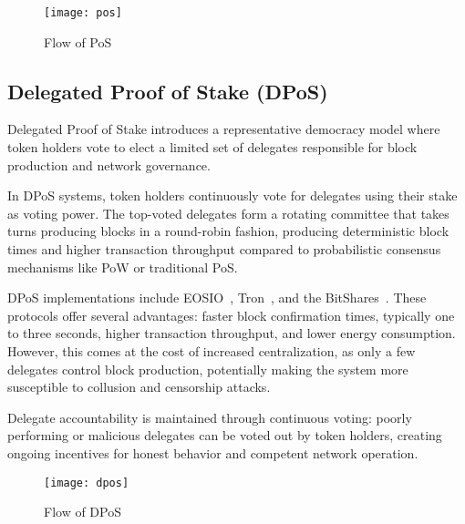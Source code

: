 \begin{figure}[h]
	\centering
	\texttt{[image: pos]}
	\caption{Flow of PoS}
	\label{fig:pos}
\end{figure}


\subsection{Delegated Proof of Stake (DPoS)}\label{sub:dpos}

Delegated Proof of Stake introduces a representative democracy model where token
holders vote to elect a limited set of delegates responsible for block production and network governance.

In DPoS systems, token holders continuously vote for delegates using their stake
as voting power. The top-voted delegates form a rotating committee that takes
turns producing blocks in a round-robin fashion, producing deterministic
block times and higher transaction throughput compared to probabilistic consensus
mechanisms like PoW or traditional PoS.

DPoS implementations include EOSIO~\cite{dpos_eosio}, Tron~\cite{dpos_tron}, and the BitShares~\cite{bitshares}.
These protocols offer several advantages: faster block confirmation times, typically one to three seconds,
higher transaction throughput, and lower energy consumption. However, this comes
at the cost of increased centralization, as only a few delegates
control block production, potentially making the system more susceptible to
collusion and censorship attacks.

Delegate accountability is maintained through continuous voting: poorly performing
or malicious delegates can be voted out by token holders, creating ongoing
incentives for honest behavior and competent network operation.

\begin{figure}[h]
	\centering
	\texttt{[image: dpos]}
	\caption{Flow of DPoS}
	\label{fig:dpos}
\end{figure}